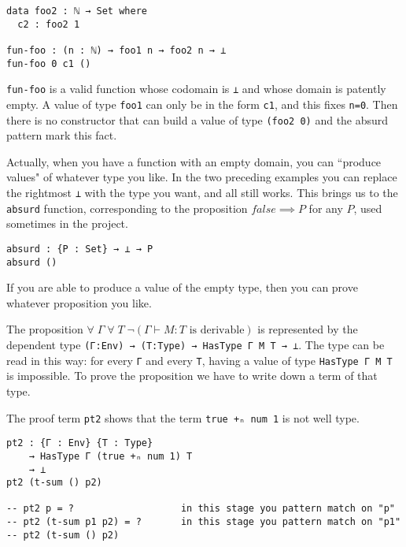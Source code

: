 \documentclass{article}
\begin{document}
\begin{tcolorbox}[breakable, enhanced, parbox=false]
\begin{verbatim}
data foo2 : ℕ → Set where
  c2 : foo2 1

fun-foo : (n : ℕ) → foo1 n → foo2 n → ⊥
fun-foo 0 c1 ()
\end{verbatim}

\texttt{fun-foo} is a valid function whose codomain is \texttt{⊥} and whose domain is patently empty.
A value of type \texttt{foo1} can only be in the form \texttt{c1}, and this fixes \texttt{n=0}.
Then there is no constructor that can build a value of type \texttt{(foo2 0)} and the absurd pattern mark this fact.

Actually, when you have a function with an empty domain, you can ``produce values" of whatever type you like.
In the two preceding examples you can replace the rightmost \texttt{⊥} with the type you want, and all still works.
This brings us to the \texttt{absurd} function, corresponding to the proposition $false \implies P$ for any $P$, used sometimes in the project.

\begin{verbatim}
absurd : {P : Set} → ⊥ → P
absurd ()
\end{verbatim}

If you are able to produce a value of the empty type, then you can prove whatever proposition you like.

\end{tcolorbox}


The proposition $\forall \; \Gamma \; \forall \; T \; \neg (\Gamma \vdash M : T \text{ is derivable})$ is represented by the dependent type \texttt{(Γ:Env) → (T:Type) → HasType Γ M T → ⊥}.
The type can be read in this way: for every \texttt{Γ} and every \texttt{T}, having a value of type \texttt{HasType Γ M T} is impossible.
To prove the proposition we have to write down a term of that type.

The proof term \texttt{pt2} shows that the term \texttt{true +ₙ num 1} is not well type.

\begin{verbatim}
pt2 : {Γ : Env} {T : Type}
    → HasType Γ (true +ₙ num 1) T
    → ⊥
pt2 (t-sum () p2)

-- pt2 p = ?                   in this stage you pattern match on "p"
-- pt2 (t-sum p1 p2) = ?       in this stage you pattern match on "p1"
-- pt2 (t-sum () p2)
\end{verbatim}
\end{document}
